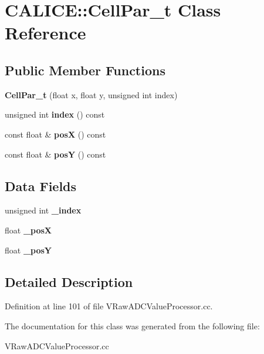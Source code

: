 \section{CALICE::CellPar\_\-t Class Reference}
\label{classCALICE_1_1CellPar__t}
\subsection*{Public Member Functions}
\begin{DoxyCompactItemize}
\item 
{\bfseries CellPar\_\-t} (float x, float y, unsigned int index)\label{classCALICE_1_1CellPar__t_a4a421af43e94b139ef5dcfd7525c2271}

\item 
unsigned int {\bfseries index} () const \label{classCALICE_1_1CellPar__t_a24feee6789d715f0503092d8594b34e4}

\item 
const float \& {\bfseries posX} () const \label{classCALICE_1_1CellPar__t_a1e053bcf09cd9d47c42f5bb05e18bb10}

\item 
const float \& {\bfseries posY} () const \label{classCALICE_1_1CellPar__t_a64b678b384ef3bc481ce1c2f9aa07808}

\end{DoxyCompactItemize}
\subsection*{Data Fields}
\begin{DoxyCompactItemize}
\item 
unsigned int {\bfseries \_\-index}\label{classCALICE_1_1CellPar__t_a2f58580b68327c8eab7867461106119a}

\item 
float {\bfseries \_\-posX}\label{classCALICE_1_1CellPar__t_a3b93d132cf7bb73e042c88c060c8e115}

\item 
float {\bfseries \_\-posY}\label{classCALICE_1_1CellPar__t_a43eb3039ef1edbedba6953629cd16c05}

\end{DoxyCompactItemize}


\subsection{Detailed Description}


Definition at line 101 of file VRawADCValueProcessor.cc.

The documentation for this class was generated from the following file:\begin{DoxyCompactItemize}
\item 
VRawADCValueProcessor.cc\end{DoxyCompactItemize}
